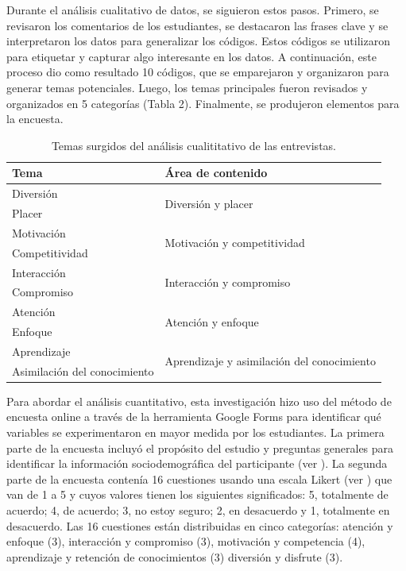 \documentclass[spanish]{textolivre}
\begin{document}
Durante el análisis cualitativo de datos, se siguieron estos pasos. Primero, se revisaron los comentarios de los estudiantes, se destacaron las frases clave y se interpretaron los datos para generalizar los códigos. Estos códigos se utilizaron para etiquetar y capturar algo interesante en los datos. A continuación, este proceso dio como resultado 10 códigos, que se emparejaron y organizaron para generar temas potenciales. Luego, los temas principales fueron revisados y organizados en 5 categorías (Tabla 2). Finalmente, se produjeron elementos para la encuesta.

\begin{table}[htpb]
\caption{Temas surgidos del análisis cualititativo de las entrevistas.}
\label{tab2}
\centering
\begin{tabular}{p{}p{}}
\toprule 
Tema & Área de contenido
\\ 
\midrule
Diversión & \multirow{2}{=}{Diversión y placer}
\\
Placer &
\\
Motivación & \multirow{2}{=}{Motivación y competitividad}
\\
Competitividad & 
\\
Interacción & \multirow{2}{=}{Interacción y compromiso}
\\
Compromiso	&
\\
Atención & \multirow{2}{=}{Atención y enfoque}
\\
Enfoque	& 
\\
Aprendizaje & \multirow{2}{=}{Aprendizaje y asimilación del conocimiento}
\\
Asimilación del conocimiento	
\\ 
\bottomrule
\end{tabular}
\end{table}

Para abordar el análisis cuantitativo, esta investigación hizo uso del método de encuesta online a través de la herramienta Google Forms para identificar qué variables se experimentaron en mayor medida por los estudiantes. La primera parte de la encuesta incluyó el propósito del estudio y preguntas generales para identificar la información sociodemográfica del participante (ver ). La segunda parte de la encuesta contenía 16 cuestiones usando una escala Likert (ver ) que van de 1 a 5 y cuyos valores tienen los siguientes significados: 5, totalmente de acuerdo; 4, de acuerdo; 3, no estoy seguro; 2, en desacuerdo y 1, totalmente en desacuerdo. Las 16 cuestiones están distribuidas en cinco categorías: atención y enfoque (3), interacción y compromiso (3), motivación y competencia (4), aprendizaje y retención de conocimientos (3) diversión y disfrute (3). 
\end{document}
